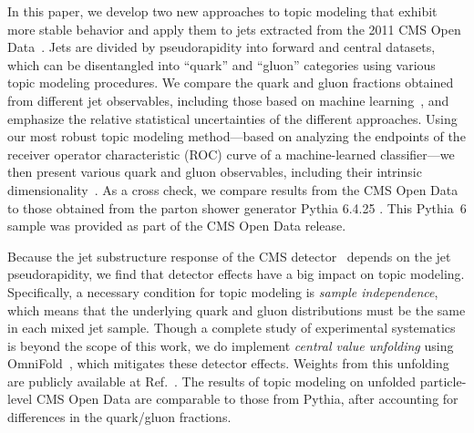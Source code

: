 \documentclass[aps,prd,twocolumn,preprintnumbers,nofootinbib,longbibliography,floatfix]{revtex4-1}
\newcommand{\sk}[1]{\textbf{\textcolor{red}{(#1 --sk)}}}
\DeclareRobustCommand{\Ref}[1]{Ref.~\cite{#1}}
\newcommand{\Pythia}{{\sc Pythia}\xspace}
\newcommand{\OmniFold}{{\sc OmniFold}\xspace}
\newcommand{\cor}[1]{#1}
\begin{document}
In this paper, we develop two new approaches to topic modeling that exhibit more stable behavior and apply them to jets extracted from the 2011 CMS Open Data~\cite{CMS:JetPrimary2011A,Komiske:2019jim,MOD:ZenodoCMS}.
%
Jets are divided by pseudorapidity into forward and central datasets, which can be disentangled into ``quark'' and ``gluon'' categories using various topic modeling procedures.
%
We compare the quark and gluon fractions obtained from different jet observables, including those based on machine learning~\cite{Komiske:2018cqr}, and emphasize the relative statistical uncertainties of the different approaches.
%
Using our most robust topic modeling method---based on analyzing the endpoints of the receiver operator characteristic (ROC) curve of a machine-learned classifier---we then present various quark and gluon observables, including their intrinsic dimensionality~\cite{Grassberger:1983zz,CAMASTRA20032945,NIPS2002_1177967c,Komiske:2019fks}.
%
As a cross check, we compare results from the CMS Open Data to those obtained from the parton shower generator \Pythia 6.4.25 \cite{Sjostrand:2006za}. 
%
\cor{This \Pythia~6 sample was provided as part of the CMS Open Data release.}


Because the jet substructure response of the CMS detector~\cite{Chatrchyan:2008aa} depends on the jet pseudorapidity, we find that detector effects have a big impact on topic modeling.
%
Specifically, a necessary condition for topic modeling is \emph{sample independence}, which means that the underlying quark and gluon distributions must be the same in each mixed jet sample.
%
Though a complete study of experimental systematics is beyond the scope of this work, we do implement \emph{central value unfolding} using \OmniFold~\cite{Andreassen:2019cjw,Andreassen:2021zzk}, which mitigates these detector effects.
%
Weights from this unfolding are publicly available at \Ref{MOD:ZenodoCMSOmniFold}.
%
%
\cor{The results of topic modeling on unfolded particle-level CMS Open Data are comparable to those from Pythia, after accounting for differences in the quark/gluon fractions.}
%
\end{document}
